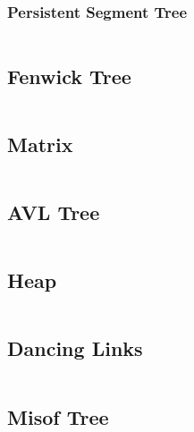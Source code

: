 \documentclass[9pt,a4paper,twocolumn,landscape,oneside]{amsart}
\newcommand{\code}[1]{\inputminted{cpp}{_code/#1}}
\newif\ifverbose
\begin{document}
        \subsubsection{Persistent Segment Tree}
        \code{data-structures/persistent_segment_tree.cpp}

    \subsection{Fenwick Tree}
        \ifverbose
        A Fenwick Tree is a data structure that represents an array of $n$
        numbers. It supports adjusting the $i$-th element in $O(\log n)$ time,
        and computing the sum of numbers in the range $i..j$ in $O(\log n)$
        time. It only needs $O(n)$ space.
        \fi
        \code{data-structures/fenwick_tree.cpp}

    \subsection{Matrix}
        \ifverbose
        A Matrix class.
        \fi
        \code{data-structures/matrix.cpp}

    \subsection{AVL Tree}
        \ifverbose
        A fast, easily augmentable, balanced binary search tree.
        \fi
        \code{data-structures/avl_tree.cpp}

        \ifverbose
        Also a very simple wrapper over the AVL tree that implements a map
        interface.
        \code{data-structures/avl_map.cpp}
        \fi

    \subsection{Heap}
        \ifverbose
        An implementation of a binary heap.
        \fi
        \code{data-structures/heap.cpp}

    \subsection{Dancing Links}
        \ifverbose
        An implementation of Donald Knuth's Dancing Links data structure. A
        linked list supporting deletion and restoration of elements.
        \fi
        \code{data-structures/dancing_links.cpp}

    \subsection{Misof Tree}
        \ifverbose
        A simple tree data structure for inserting, erasing, and querying the
        $n$th largest element.
        \fi
        \code{data-structures/misof_tree.cpp}
\end{document}
